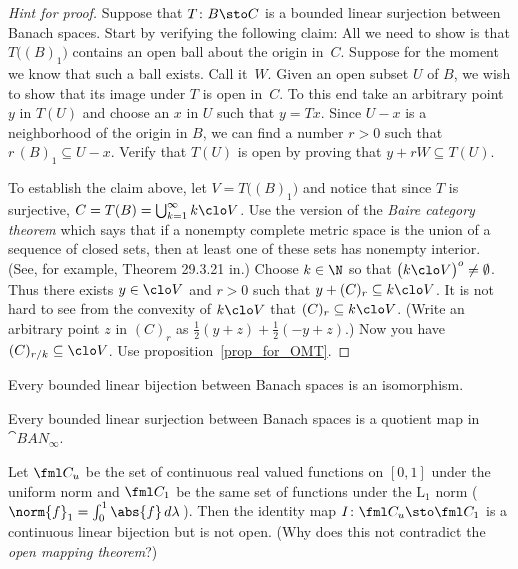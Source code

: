 \begin{proof}[\emph{Hint for proof}] Suppose that $T\colon B \sto C$ is a bounded linear surjection between Banach spaces.
Start by verifying the following claim: All we need to show is that $T\bigl((B)_1\bigr)$ contains an open ball about the
origin in~$C$.  Suppose for the moment we know that such a ball exists.  Call it~$W$.  Given an open subset $U$ of $B$, we
wish to show that its image under $T$ is open in~$C$.  To this end take an arbitrary point $y$ in $T(U)$ and choose an $x$
in $U$ such that $y = Tx$.  Since $U - x$ is a neighborhood of the origin in $B$, we can find a number $r > 0$ such that
$r\,(B)_1 \subseteq U - x$.  Verify that $T(U)$ is open by proving that $y + rW \subseteq T(U)$.

To establish the claim above, let $V = T\bigl((B)_1\bigr)$ and notice that since $T$ is surjective, $C = T(B) =
\bigcup_{k=1}^\infty k\clo V$.  Use the version of the \emph{Baire category theorem} which says that if a nonempty
complete metric space is the union of a sequence of closed sets, then at least one of these sets has nonempty interior.
(See, for example, Theorem 29.3.21 in\cite{Erdman:2007}.)  Choose $k \in \N$ so that $\bigl(k\clo V\bigr)^o \neq \emptyset$.
Thus there exists $y \in \clo V$ and $r > 0$ such that $y + (C)_r \subseteq k\clo V$.  It is not hard to see from the
convexity of $k\clo V$ that $(C)_r \subseteq k\clo V$.  (Write an arbitrary point $z$ in $(C)_r$ as
$\frac12(y + z) + \frac12(-y + z)$.) Now you have $(C)_{r/k} \subseteq \clo V$.  Use proposition~\ref{prop_for_OMT}.
\ns \end{proof}

\begin{cor}\label{C069417} Every bounded linear bijection between Banach spaces is an
isomorphism.
\end{cor}

\begin{cor} Every bounded linear surjection between Banach spaces
is a quotient map in~$\cat{BAN_\infty}$.
\end{cor}

\begin{exam} Let $\fml C_u$ be the set of continuous real valued functions on $[0,1]$ under
the uniform norm and $\fml C_1$ be the same set of functions under the $\mathrm{L_1}$ norm
(\,$\norm{f}_1 = \int_0^1\abs{f}\,d\lambda$\,). Then the identity map $I\colon \fml C_u
\sto \fml C_1$ is a continuous linear bijection but is not open. (Why does this not
contradict the \emph{open mapping theorem}?)
\end{exam}

